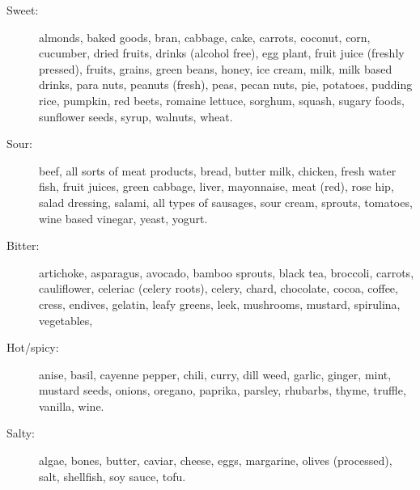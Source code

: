 \documentclass[../main.tex]{subfiles}
\begin{document}
\begin{description}
\item[Sweet:]
almonds, baked goods, bran, cabbage, cake, carrots, coconut, corn, cucumber, dried fruits, drinks (alcohol free), egg plant, fruit juice (freshly pressed), fruits, grains, green beans, honey, ice cream, milk, milk based drinks, para nuts, peanuts (fresh), peas, pecan nuts, pie, potatoes, pudding rice, pumpkin, red beets, romaine lettuce, sorghum, squash, sugary foods, sunflower seeds, syrup, walnuts, wheat. 
\item[Sour:]
beef, all sorts of meat products, bread, butter milk, chicken, fresh water fish, fruit juices, green cabbage, liver, mayonnaise, meat (red), rose hip, salad dressing, salami, all types of sausages, sour cream, sprouts, tomatoes, wine based vinegar, yeast, yogurt.
\item[Bitter:]
artichoke, asparagus, avocado, bamboo sprouts, black tea, broccoli, carrots, cauliflower, celeriac (celery roots), celery, chard, chocolate, cocoa, coffee, cress, endives, gelatin, leafy greens, leek, mushrooms, mustard, spirulina, vegetables,
\item[Hot/spicy:]
anise, basil, cayenne pepper, chili, curry, dill weed, garlic, ginger, mint, mustard seeds, onions, oregano, paprika, parsley, rhubarbs, thyme, truffle, vanilla, wine. 
\item[Salty:]
algae, bones, butter, caviar, cheese, eggs, margarine, olives (processed), salt, shellfish, soy sauce, tofu.
\end{description}
\end{document}
